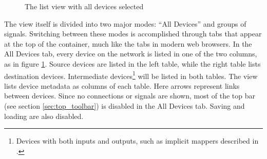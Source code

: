 \begin{figure}[ht]
\centering
\caption{The list view with all devices selected}
\label{fig:list_view_all_devices}
\end{figure}

The view itself is divided into two major modes: ``All Devices'' and groups of signals. Switching between these modes is accomplished through tabs that appear at the top of the container, much like the tabs in modern web browsers. In the All Devices tab, every device on the network is listed in one of the two columns, as in figure \ref{fig:list_view_all_devices}. Source devices are listed in the left table, while the right table lists destination devices. Intermediate devices\footnote{Devices with both inputs and outputs, such as implicit mappers described in .} will be listed in both tables. The view lists device metadata as columns of each table. Here arrows represent links between devices. Since no connections or signals are shown, most of the top bar (see section \ref{sec:top_toolbar}) is disabled in the All Devices tab. Saving and loading are also disabled.

